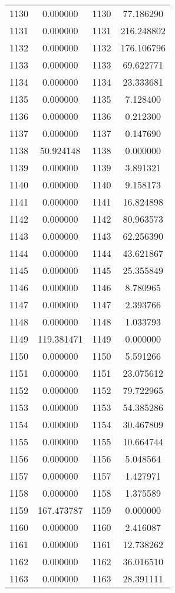\documentclass[12pt]{article}
\begin{document}
\begin{longtable}{@{}cccc@{}}
1130 & 0.000000 & 1130 & 77.186290 \\
1131 & 0.000000 & 1131 & 216.248802 \\
1132 & 0.000000 & 1132 & 176.106796 \\
1133 & 0.000000 & 1133 & 69.622771 \\
1134 & 0.000000 & 1134 & 23.333681 \\
1135 & 0.000000 & 1135 & 7.128400 \\
1136 & 0.000000 & 1136 & 0.212300 \\
1137 & 0.000000 & 1137 & 0.147690 \\
1138 & 50.924148 & 1138 & 0.000000 \\
1139 & 0.000000 & 1139 & 3.891321 \\
1140 & 0.000000 & 1140 & 9.158173 \\
1141 & 0.000000 & 1141 & 16.824898 \\
1142 & 0.000000 & 1142 & 80.963573 \\
1143 & 0.000000 & 1143 & 62.256390 \\
1144 & 0.000000 & 1144 & 43.621867 \\
1145 & 0.000000 & 1145 & 25.355849 \\
1146 & 0.000000 & 1146 & 8.780965 \\
1147 & 0.000000 & 1147 & 2.393766 \\
1148 & 0.000000 & 1148 & 1.033793 \\
1149 & 119.381471 & 1149 & 0.000000 \\
1150 & 0.000000 & 1150 & 5.591266 \\
1151 & 0.000000 & 1151 & 23.075612 \\
1152 & 0.000000 & 1152 & 79.722965 \\
1153 & 0.000000 & 1153 & 54.385286 \\
1154 & 0.000000 & 1154 & 30.467809 \\
1155 & 0.000000 & 1155 & 10.664744 \\
1156 & 0.000000 & 1156 & 5.048564 \\
1157 & 0.000000 & 1157 & 1.427971 \\
1158 & 0.000000 & 1158 & 1.375589 \\
1159 & 167.473787 & 1159 & 0.000000 \\
1160 & 0.000000 & 1160 & 2.416087 \\
1161 & 0.000000 & 1161 & 12.738262 \\
1162 & 0.000000 & 1162 & 36.016510 \\
1163 & 0.000000 & 1163 & 28.391111 \\

\end{longtable}
\end{document}
